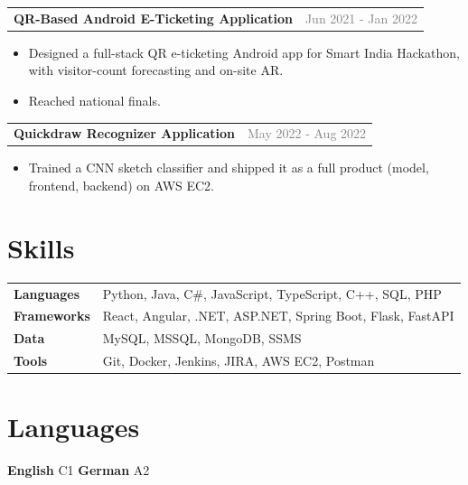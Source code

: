 \documentclass[10pt, letterpaper]{article}
\makeatletter
\newcommand{\projectEntry}[2]{%
  \vspace{2pt}%
  \noindent
  \begin{tabularx}{\linewidth}{@{}X r@{}}
    \textbf{#1} & \textcolor{gray}{\small #2}
  \end{tabularx}\par
}
\makeatother
\begin{document}
\projectEntry{QR-Based Android E-Ticketing Application}{Jun 2021 - Jan 2022}
\begin{itemize}
  \item Designed a full-stack QR e-ticketing Android app for Smart India Hackathon, with visitor-count forecasting and on-site AR.
  \item Reached national finals.
\end{itemize}

\projectEntry{Quickdraw Recognizer Application}{May 2022 - Aug 2022}
\begin{itemize}
  \item Trained a CNN sketch classifier and shipped it as a full product (model, frontend, backend) on AWS EC2.
\end{itemize}

\section{Skills}

\vspace{1pt}
\begin{tabularx}{\linewidth}{@{}>{\bfseries\small}l X@{}}
  Languages & \small Python, Java, C\#, JavaScript, TypeScript, C++, SQL, PHP \\[3pt]
  Frameworks & \small React, Angular, .NET, ASP.NET, Spring Boot, Flask, FastAPI \\[3pt]
  Data & \small MySQL, MSSQL, MongoDB, SSMS \\[3pt]
  Tools & \small Git, Docker, Jenkins, JIRA, AWS EC2, Postman \\
\end{tabularx}

\section{Languages}

\vspace{1pt}
\noindent\textbf{English} C1 \qquad \textbf{German} A2
\end{document}

